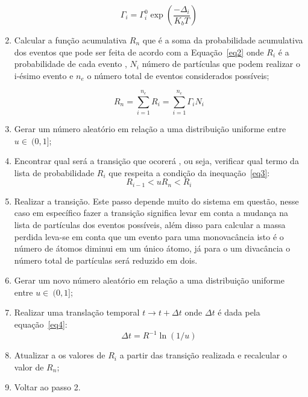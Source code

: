 \documentclass[12pt]{elsarticle}
\begin{document}
\begin{enumerate}
    \begin{equation}
        \Gamma_i = \Gamma_{i}^{0}\exp{\left({\frac{-\Delta_i}{K_b T}}\right)}
        \label{eq1}
    \end{equation}

\item Calcular a função acumulativa $R_n$ que é a soma da probabilidade acumulativa dos eventos que pode ser feita de acordo com a Equação~\ref{eq2} onde $R_i$ é a probabilidade de cada evento , $N_i$ número de partículas que podem realizar o i-ésimo evento e $n_e$ o número total de eventos considerados possíveis; 

    \begin{equation}
        R_n = \sum_{i=1}^{n_e} R_i = \sum_{i=1}^{n_e} \Gamma_i N_i
        \label{eq2}
    \end{equation}

\item Gerar um número aleatório em relação a uma distribuição uniforme entre $u \in~(0,1]$;
\item Encontrar qual será a transição que ocorerá , ou seja, verificar qual termo da lista de probabilidade $R_i$ que respeita a condição da inequação~\ref{eq3}: 
    \begin{equation} 
    R_{i-1} < uR_n < R_i
    \label{eq3}
    \end{equation}

\item Realizar a transição. Este passo depende muito do sistema em questão, nesse caso em específico fazer a transição significa levar em conta a mudança na lista de partículas dos eventos possíveis, além disso para calcular a massa perdida leva-se em conta que um evento para uma monovacância isto é o número de átomos diminui em um único átomo, já para o um divacância o número total de partículas será reduzido em dois.

\item Gerar um novo número aleatório em relação a uma distribuição uniforme entre $u \in~(0,1]$;
\item Realizar uma translação temporal $t \rightarrow t+\Delta t$ onde $\Delta t$ é dada pela equação~\ref{eq4}:
    \begin{equation}
        \Delta t = R^{-1} \ln{(1/u)}
        \label{eq4}
    \end{equation}

\item Atualizar a os valores de $R_i$ a partir das transição realizada e recalcular o valor de $R_n$; 
\item Voltar ao passo 2.

\end{enumerate}
\end{document}
